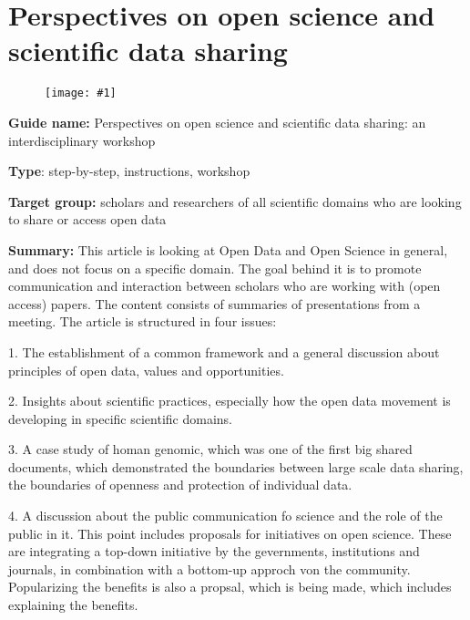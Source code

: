 \documentclass{article}
\newlength{\imgwidth}
\newcommand\scaledgraphics[2]{%
                
\settowidth{\imgwidth}{\texttt{[image: \#1]}}%
                
\setlength{\imgwidth}{\minof{\imgwidth}{#2\textwidth}}%
                
\texttt{[image: \#1]}%
                
}
\begin{document}
\section{Perspectives on open science and scientific data sharing}\label{H5120034}



\begin{center}
\begin{figure}
\scaledgraphics{6ab89e0c-e542-4afd-b586-eabe59773bc0.jpg}{0.5}
\label{F43484161}
\end{figure}


\end{center}





\textbf{Guide name:}  Perspectives on open science and scientific data sharing: an interdisciplinary workshop \autocite{destro_bisol_perspectives_2014}


\textbf{Type}: step-by-step, instructions, workshop


\textbf{Target group:} scholars and researchers of all scientific domains who are looking to share or access open data


\textbf{Summary:} This article is looking at Open Data and Open Science in general, and does not focus on a specific domain. The goal behind it is to promote communication and interaction between scholars who are working with (open access) papers. The content consists of summaries of presentations from a meeting. The article is structured in four issues:


1. The establishment of a common framework and a general discussion about principles of open data, values and opportunities.


2. Insights about scientific practices, especially how the open data movement is developing in specific scientific domains.


3. A case study of homan genomic, which was one of the first big shared documents, which demonstrated the boundaries between large scale data sharing, the boundaries of openness and protection of individual data.


4. A discussion about the public communication fo science and the role of the public in it. This point includes proposals for initiatives on open science. These are integrating a top-down initiative by the gevernments, institutions and journals, in combination with a bottom-up approch von the community. Popularizing the benefits is also a propsal, which is being made, which includes explaining the benefits.
\end{document}
